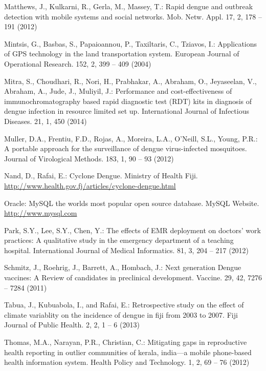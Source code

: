 \documentclass[runningheads,a4paper]{llncs}
\begin{document}
\begin{thebibliography}{4}
 Matthews, J., Kulkarni, R., Gerla, M., Massey, T.:
Rapid dengue and outbreak detection with mobile systems and social networks.
Mob. Netw. Appl. 17, 2, 178 -- 191 (2012)

 Mintsis, G., Basbas, S., Papaioannou, P., Taxiltaris, C., Tziavos, I.:
Applications of GPS technology in the land transportation system.
European Journal of Operational Research. 152, 2, 399 -- 409 (2004)

 Mitra, S., Choudhari, R., Nori, H., Prabhakar, A., Abraham, O., Jeyaseelan, V., Abraham, A., Jude, J., Muliyil, J.:
Performance and cost-effectiveness of immunochromatography based rapid diagnostic test (RDT) kits in diagnosis of dengue infection in resource limited set up.
International Journal of Infectious Diseases. 21, 1, 450 (2014) 

 Muller, D.A., Frentiu, F.D., Rojas, A., Moreira, L.A., O’Neill, S.L., Young, P.R.:
A portable approach for the surveillance of dengue virus-infected mosquitoes.
Journal of Virological Methods. 183, 1, 90 -- 93 (2012) 

 Nand, D., Rafai, E.:
Cyclone Dengue. Ministry of Health Fiji. \url{http://www.health.gov.fj/articles/cyclone-dengue.html}

 Oracle: MySQL the worlds most popular open source database. MySQL Website.
\url{http://www.mysql.com}

 Park, S.Y., Lee, S.Y., Chen, Y.:
The effects of EMR deployment on doctors’ work practices: A qualitative study in the emergency department of a teaching hospital.
International Journal of Medical Informatics. 81, 3, 204 -- 217 (2012)

 Schmitz, J., Roehrig, J., Barrett, A., Hombach, J.:
Next generation Dengue vaccines: A Review of candidates in preclinical development.
Vaccine. 29, 42, 7276 -- 7284 (2011)


 Tabua, J., Kubuabola, I., and Rafai, E.:
Retrospective study on the effect of climate variablity on the incidence of dengue in fiji from 2003 to 2007.
Fiji Journal of Public Health. 2, 2, 1 -- 6 (2013)

 Thomas, M.A., Narayan, P.R., Christian, C.:
Mitigating gaps in reproductive health reporting in outlier communities of kerala, india—a mobile phone-based health information system.
Health Policy and Technology. 1, 2, 69 -- 76 (2012)


\end{thebibliography}
\end{document}
